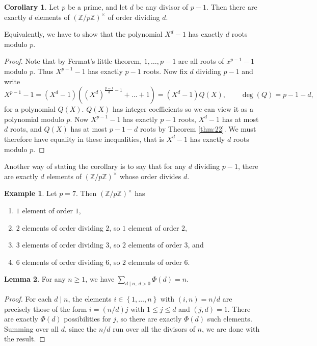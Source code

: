 \documentclass{article}
\newcommand{\Z}{\mathbb{Z}}
\newcommand{\rb}[1]{\left( #1 \right)}
\newcommand{\cb}[1]{\left\{ #1 \right\}}
\newcommand{\unit}[1]{\rb{\Z / #1\Z}^\times}
\theoremstyle{definition}\newtheorem{definition}{Definition}
\theoremstyle{definition}\newtheorem*{remark}{Remark}
\theoremstyle{definition}\newtheorem*{example}{Example}
\theoremstyle{definition}\newtheorem*{note}{Note}
\newtheorem{lemma}[definition]{Lemma}
\newtheorem{corollary}[definition]{Corollary}
\begin{document}
\begin{corollary}
\label{cor:23}
Let $ p $ be a prime, and let $ d $ be any divisor of $ p - 1 $. Then there are exactly $ d $ elements of $ \unit{p} $ of order dividing $ d $.
\end{corollary}

Equivalently, we have to show that the polynomial $ X^d - 1 $ has exactly $ d $ roots modulo $ p $.

\begin{proof}
Note that by Fermat's little theorem, $ 1, \dots, p - 1 $ are all roots of $ x^{p - 1} - 1 $ modulo $ p $. Thus $ X^{p - 1} - 1 $ has exactly $ p - 1 $ roots. Now fix $ d $ dividing $ p - 1 $ and write
$$ X^{p - 1} - 1 = \rb{X^d - 1}\rb{\rb{X^d}^{\tfrac{p - 1}{d} - 1} + \dots + 1} = \rb{X^d - 1}Q\rb{X}, \qquad \deg\rb{Q} = p - 1 - d, $$
for a polynomial $ Q\rb{X} $. $ Q\rb{X} $ has integer coefficients so we can view it as a polynomial modulo $ p $. Now $ X^{p - 1} - 1 $ has exactly $ p - 1 $ roots, $ X^d - 1 $ has at most $ d $ roots, and $ Q\rb{X} $ has at most $ p - 1 - d $ roots by Theorem \ref{thm:22}. We must therefore have equality in these inequalities, that is $ X^d - 1 $ has exactly $ d $ roots modulo $ p $.
\end{proof}

Another way of stating the corollary is to say that for any $ d $ dividing $ p - 1 $, there are exactly $ d $ elements of $ \unit{p} $ whose order divides $ d $.

\begin{example}
Let $ p = 7 $. Then $ \unit{p} $ has
\begin{enumerate}
\item $ 1 $ element of order $ 1 $,
\item $ 2 $ elements of order dividing $ 2 $, so $ 1 $ element of order $ 2 $,
\item $ 3 $ elements of order dividing $ 3 $, so $ 2 $ elements of order $ 3 $, and
\item $ 6 $ elements of order dividing $ 6 $, so $ 2 $ elements of order $ 6 $.
\end{enumerate}
\end{example}

\begin{lemma}
\label{lem:24}
For any $ n \ge 1 $, we have $ \sum_{d \mid n, \ d > 0} \Phi\rb{d} = n $.
\end{lemma}

\begin{proof}
For each $ d \mid n $, the elements $ i \in \cb{1, \dots, n} $ with $ \rb{i, n} = n / d $ are precisely those of the form $ i = \rb{n / d}j $ with $ 1 \le j \le d $ and $ \rb{j, d} = 1 $. There are exactly $ \Phi\rb{d} $ possibilities for $ j $, so there are exactly $ \Phi\rb{d} $ such elements. Summing over all $ d $, since the $ n / d $ run over all the divisors of $ n $, we are done with the result.
\end{proof}
\end{document}
